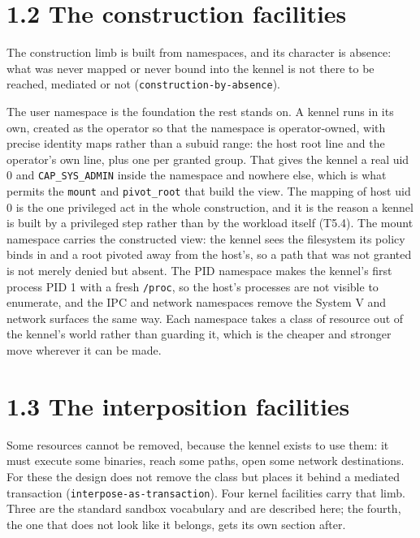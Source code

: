 \hypertarget{the-construction-facilities}{%
\section{1.2 The construction
facilities}\label{the-construction-facilities}}

The construction limb is built from namespaces, and its character is
absence: what was never mapped or never bound into the kennel is not
there to be reached, mediated or not (\texttt{construction-by-absence}).

The user namespace is the foundation the rest stands on. A kennel runs
in its own, created as the operator so that the namespace is
operator-owned, with precise identity maps rather than a subuid range:
the host root line and the operator's own line, plus one per granted
group. That gives the kennel a real uid 0 and \texttt{CAP\_SYS\_ADMIN}
inside the namespace and nowhere else, which is what permits the
\texttt{mount} and \texttt{pivot\_root} that build the view. The mapping
of host uid 0 is the one privileged act in the whole construction, and
it is the reason a kennel is built by a privileged step rather than by
the workload itself (T5.4). The mount namespace carries the constructed
view: the kennel sees the filesystem its policy binds in and a root
pivoted away from the host's, so a path that was not granted is not
merely denied but absent. The PID namespace makes the kennel's first
process PID 1 with a fresh \texttt{/proc}, so the host's processes are
not visible to enumerate, and the IPC and network namespaces remove the
System V and network surfaces the same way. Each namespace takes a class
of resource out of the kennel's world rather than guarding it, which is
the cheaper and stronger move wherever it can be made.

\hypertarget{the-interposition-facilities}{%
\section{1.3 The interposition
facilities}\label{the-interposition-facilities}}

Some resources cannot be removed, because the kennel exists to use them:
it must execute some binaries, reach some paths, open some network
destinations. For these the design does not remove the class but places
it behind a mediated transaction (\texttt{interpose-as-transaction}).
Four kernel facilities carry that limb. Three are the standard sandbox
vocabulary and are described here; the fourth, the one that does not
look like it belongs, gets its own section after.

